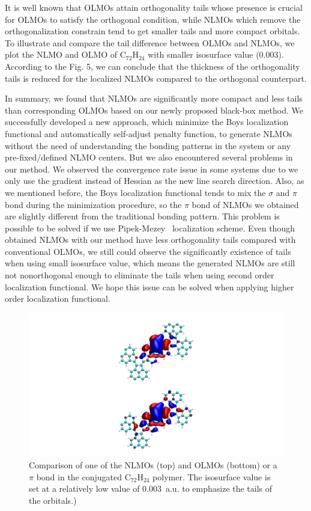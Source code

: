 \documentclass[aps,prl,reprint,amsmath,amssymb]{revtex4-1}
\begin{document}
It is well known that OLMOs attain orthogonality tails whose presence is crucial for OLMOs to satisfy the orthogonal condition, while NLMOs which remove the orthogonalization constrain tend to get smaller tails and more compact orbitals. 
To illustrate and compare the tail difference between OLMOs and NLMOs, we plot the NLMO and OLMO of C$_{72}$H$_{24}$ with smaller isosurface value (0.003).
According to the Fig. 5, we can conclude that the thickness of the orthogonality tails is reduced for the localized NLMOs compared to the orthogonal counterpart.

In summary, we found that NLMOs are significantly more compact and less tails than corresponding OLMOs based on our newly proposed black-box method. 
We successfully developed a new approach, which minimize the Boys localization functional and automatically self-adjust penalty function, to generate NLMOs without the need of understanding the bonding patterns in the system or any pre-fixed/defined NLMO centers.
But we also encountered several problems  in our method.
We observed the convergence rate issue in some systems due to we only use the gradient instead of Hessian as the new line search direction.
Also, as we mentioned before, the Boys localization functional tends to mix the $\sigma$ and $\pi$ bond during the minimization procedure, so the $\pi$ bond of NLMOs we obtained are slightly different from the traditional bonding pattern.
This problem is possible to be solved if we use Pipek-Mezey~\cite{pipek1989a_fast} localization scheme.
Even though obtained NLMOs with our method have less orthogonality tails compared with conventional OLMOs, we still could observe the significantly existence of tails when using small isosurface value, which means the generated NLMOs are still not nonorthogonal enough to eliminate the tails when using second order localization functional. 
We hope this issue can be solved when applying higher order localization functional.

\begin{figure}[htbp]
\includegraphics[scale=0.6]{figure_5.pdf} 
  \caption{Comparison of one of the NLMOs (top) and OLMOs (bottom) or a $\pi$ bond in the conjugated C$_{72}$H$_{24}$ polymer. The isosurface value is set at a relatively low value of 0.003~a.u. to emphasize the tails of the orbitals.)}
\end{figure}
\end{document}
